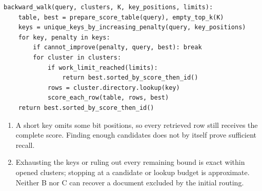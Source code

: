 \begin{lstlisting}
backward_walk(query, clusters, K, key_positions, limits):
    table, best = prepare_score_table(query), empty_top_k(K)
    keys = unique_keys_by_increasing_penalty(query, key_positions)
    for key, penalty in keys:
        if cannot_improve(penalty, query, best): break
        for cluster in clusters:
            if work_limit_reached(limits):
                return best.sorted_by_score_then_id()
            rows = cluster.directory.lookup(key)
            score_each_row(table, rows, best)
    return best.sorted_by_score_then_id()
\end{lstlisting}

\begin{enumerate}[start=6]
\item A short key omits some bit positions, so every retrieved row still receives the complete score. Finding enough candidates does not by itself prove sufficient recall.
\item Exhausting the keys or ruling out every remaining bound is exact within opened clusters; stopping at a candidate or lookup budget is approximate. Neither B nor C can recover a document excluded by the initial routing.
\end{enumerate}
